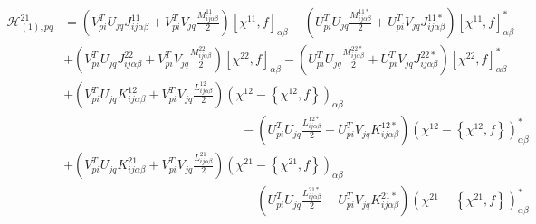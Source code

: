 \documentclass[a4paper,12pt]{book}
\begin{document}
\begin{align*}
\mathcal{H}_{(1),pq}^{21} &= \left(V^T_{pi} U_{jq} J_{ij\alpha\beta}^{11} + V_{pi}^T V_{jq} \frac{M_{ij\alpha\beta}^{11}}{2} \right)[\chi^{11},f]_{\alpha\beta} -
 \left(U_{pi}^T U_{jq} \frac{M_{ij\alpha\beta}^{11*}}{2} + U_{pi}^T V_{jq} J_{ij\alpha\beta}^{11*}  \right)[\chi^{11},f]^*_{\alpha\beta} \\
&+ \left(V_{pi}^T U_{jq} J_{ij\alpha\beta}^{22} + V_{pi}^T V_{jq} \frac{M_{ij\alpha\beta}^{22}}{2} \right)[\chi^{22},f]_{\alpha\beta} -
 \left(U_{pi}^T U_{jq} \frac{M_{ij\alpha\beta}^{22*}}{2} + U_{pi}^T V_{jq} J_{ij\alpha\beta}^{22*}  \right)[\chi^{22},f]^*_{\alpha\beta} \\
&+ \left(V_{pi}^T U_{jq} K_{ij\alpha\beta}^{12} + V_{pi}^T V_{jq} \frac{L_{ij\alpha\beta}^{12}}{2} \right)\left(\chi^{12}-\left\{\chi^{12},f\right\}\right)_{\alpha\beta} \\ &\qquad\qquad\qquad\qquad\qquad\qquad\qquad-
 \left(U_{pi}^T U_{jq} \frac{L_{ij\alpha\beta}^{12*}}{2} + U_{pi}^T V_{jq} K_{ij\alpha\beta}^{12*}  \right)\left(\chi^{12}-\left\{\chi^{12},f\right\}\right)^*_{\alpha\beta} \\
&+ \left(V_{pi}^T U_{jq} K_{ij\alpha\beta}^{21} + V_{pi}^T V_{jq} \frac{L_{ij\alpha\beta}^{21}}{2} \right)\left(\chi^{21}-\left\{\chi^{21},f\right\}\right)_{\alpha\beta} \\ &\qquad\qquad\qquad\qquad\qquad\qquad\qquad-
 \left(U_{pi}^T U_{jq} \frac{L_{ij\alpha\beta}^{21*}}{2} + U_{pi}^T V_{jq} K_{ij\alpha\beta}^{21*}  \right)\left(\chi^{21}-\left\{\chi^{21},f\right\}\right)^*_{\alpha\beta}
\end{align*}
\end{document}
